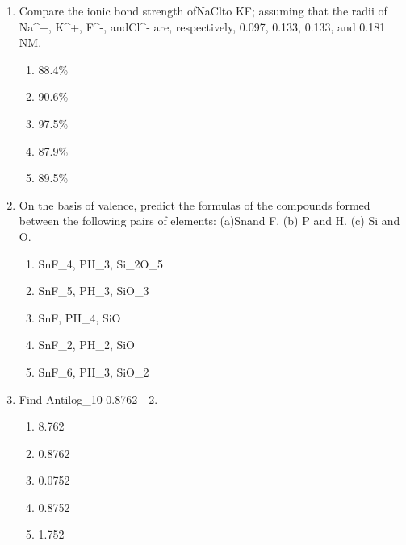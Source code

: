 \documentclass[12pt]{article}
\begin{document}
\begin{enumerate}[label=\arabic*.]
\begin{enumerate}[label=(\alph*)]
\end{enumerate}
\item Compare the ionic bond strength ofNaClto KF; assuming that the radii of Na\^{}+, K\^{}+, F\^{}-,
andCl\^{}- are, respectively, 0.097, 0.133, 0.133, and 0.181 NM.
\begin{enumerate}[label=(\alph*)]
    \item 88.4\%
    \item 90.6\%
    \item 97.5\%
    \item 87.9\%
    \item 89.5\%
\end{enumerate}
\item On the basis of valence, predict the formulas of the compounds formed between the
following pairs of elements: (a)Snand F. (b) P and H. (c) Si and O.
\begin{enumerate}[label=(\alph*)]
    \item SnF\_4, PH\_3, Si\_2O\_5
    \item SnF\_5, PH\_3, SiO\_3
    \item SnF, PH\_4, SiO
    \item SnF\_2, PH\_2, SiO
    \item SnF\_6, PH\_3, SiO\_2
\end{enumerate}
\item Find Antilog\_10 0.8762 - 2.
\begin{enumerate}[label=(\alph*)]
    \item 8.762
    \item 0.8762
    \item 0.0752
    \item 0.8752
    \item 1.752
\end{enumerate}
\end{enumerate}
\end{document}
